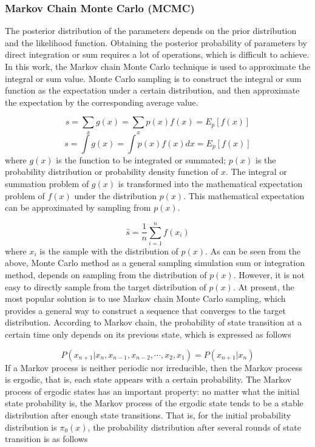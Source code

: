 \documentclass{svjour3}                     %
\begin{document}
\subsubsection{Markov Chain Monte Carlo (MCMC)}
The posterior distribution of the parameters depends on the prior distribution and the likelihood function. Obtaining the posterior probability of parameters by direct integration or sum requires a lot of operations, which is difficult to achieve. In this work, the Markov chain Monte Carlo technique is used to approximate the integral or sum value. Monte Carlo sampling is to construct the integral or sum function as the expectation under a certain distribution, and then approximate the expectation by the corresponding average value\citep{goodfellow2016deep}.

\begin{equation}\label{eq_monte_carlo_1}
s =\sum\limits_x g(x)= \sum\limits_x {p(x)f(x) = {E_p}[f(x)]}
\end{equation}
\begin{equation}\label{eq_monte_carlo_2}
s =\int {g(x)}= \int {p(x)f(x)dx}  = {E_p}[f(x)]
\end{equation}
where $g(x)$ is the function to be integrated or summated; $p(x)$ is the probability distribution or probability density function of $x$. The integral or summation problem of $g(x)$ is transformed into the mathematical expectation problem of $f(x)$ under the distribution $p(x)$. This mathematical expectation can be approximated by sampling from $p(x)$.

\begin{equation}\label{eq_monte_carlo_3}
\hat s = \frac{1}{n}\sum\limits_{i = 1}^n {f({x_i})}
\end{equation}
where $x_i$ is the sample with the distribution of $p(x)$. As can be seen from the above, Monte Carlo method as a general sampling simulation sum or integration method, depends on sampling from the distribution of $p(x)$. However, it is not easy to directly sample from the target distribution of $p(x)$. At present, the most popular solution is to use Markov chain Monte Carlo sampling, which provides a general way to construct a sequence that converges to the target distribution. According to Markov chain, the probability of state transition at a certain time only depends on its previous state, which is expressed as follows

\begin{equation}\label{eq_markov_chain_1}
P({x_{n + 1}}\left| {{x_n},{x_{n - 1}}} \right.,{x_{n - 2}}, \cdots ,{x_2},{x_1}) = P({x_{n + 1}}\left| {{x_n}} \right.)
\end{equation}
If a Markov process is neither periodic nor irreducible, then the Markov process is ergodic, that is, each state appears with a certain probability. The Markov process of ergodic states has an important property: no matter what the initial state probability is, the Markov process of the ergodic state tends to be a stable distribution after enough state transitions.
That is, for the initial probability distribution is $\pi_0(x)$, the probability distribution after several rounds of state transition is as follows
\end{document}

